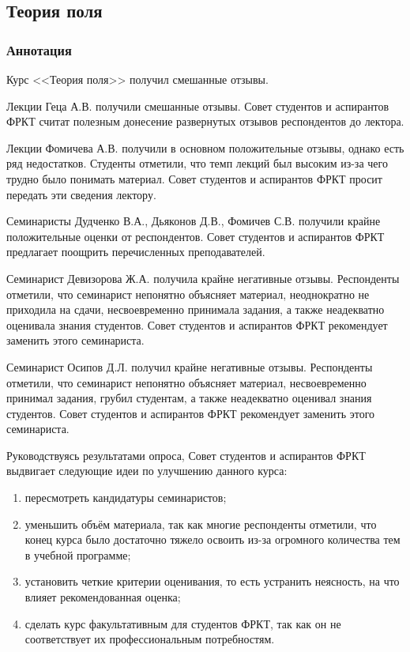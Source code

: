 \subsection{Теория поля}
	
	\subsubsection{Аннотация}

        Курс <<Теория поля>> получил смешанные отзывы. 
        
        Лекции Геца А.В. получили смешанные отзывы. Совет студентов и аспирантов ФРКТ считат полезным донесение развернутых отзывов респондентов до лектора.

        Лекции Фомичева А.В. получили в основном положительные отзывы, однако есть ряд недостатков. Студенты отметили, что темп лекций был высоким из-за чего трудно было понимать материал. Совет студентов и аспирантов ФРКТ просит передать эти сведения лектору.

        Семинаристы Дудченко В.А., Дьяконов Д.В., Фомичев С.В. получили крайне положительные оценки от респондентов. Совет студентов и аспирантов ФРКТ предлагает поощрить перечисленных преподавателей.

        Семинарист Девизорова Ж.А. получила крайне негативные отзывы. Респонденты отметили, что семинарист непонятно объясняет материал, неоднократно не приходила на сдачи, несвоевременно принимала задания, а также неадекватно оценивала знания студентов. Совет студентов и аспирантов ФРКТ рекомендует заменить этого семинариста.

        Семинарист Осипов Д.Л. получил крайне негативные отзывы. Респонденты отметили, что семинарист непонятно объясняет материал, несвоевременно принимал задания, грубил студентам, а также неадекватно оценивал знания студентов. Совет студентов и аспирантов ФРКТ рекомендует заменить этого семинариста.

        Руководствуясь результатами опроса, Совет студентов и аспирантов ФРКТ выдвигает следующие идеи по улучшению данного курса:
        \begin{enumerate}
            \item пересмотреть кандидатуры семинаристов;
            \item уменьшить объём материала, так как многие респонденты отметили, что конец курса было достаточно тяжело освоить из-за огромного количества тем в учебной программе;
            \item установить четкие критерии оценивания, то есть устранить неясность, на что влияет рекомендованная оценка; 
            \item сделать курс факультативным для студентов ФРКТ, так как он не соответствует их профессиональным потребностям.
        \end{enumerate}


